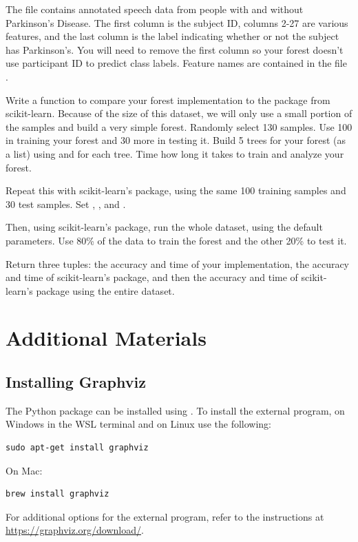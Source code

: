 \begin{problem}
The file  contains annotated speech data from people with and without Parkinson's Disease.
The first column is the subject ID, columns 2-27 are various features, and the last column is the label indicating whether or not the subject has Parkinson's. 
You will need to remove the first column so your forest doesn't use participant ID to predict class labels.
Feature names are contained in the file .

Write a function to compare your forest implementation to the package from scikit-learn.
Because of the size of this dataset, we will only use a small portion of the samples and build a very simple forest.
Randomly select 130 samples.
Use 100 in training your forest and 30 more in testing it.
Build 5 trees for your forest (as a list) using  and  for each tree.
Time how long it takes to train and analyze your forest.

Repeat this with scikit-learn's package, using the same 100 training samples and 30 test samples.
Set , , and .

Then, using scikit-learn's package, run the whole  dataset, using the default parameters.
Use 80\% of the data to train the forest and the other 20\% to test it.

Return three tuples: the accuracy and time of your implementation, the accuracy and time of scikit-learn's package, and then the accuracy and time of scikit-learn's package using the entire dataset.
\end{problem}

\section*{Additional Materials}
\subsection*{Installing Graphviz}
The Python package can be installed using .
To install the external program,
on Windows in the WSL terminal and on Linux use the following:
\begin{lstlisting}
sudo apt-get install graphviz
\end{lstlisting}
On Mac:
\begin{lstlisting}
brew install graphviz
\end{lstlisting}
For additional options for the external program, refer to the instructions at \url{https://graphviz.org/download/}.
